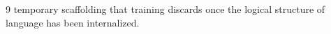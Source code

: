 \documentclass[11pt]{article}
\theoremstyle{definition}
\begin{document}
\begin{thebibliography}{9}
temporary scaffolding that training discards once the logical structure of language has been internalized.\n\n%
\end{thebibliography}
\end{document}
